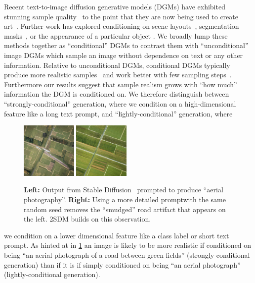 \label{sec:2sdm-intro}
Recent text-to-image diffusion generative models (DGMs) have exhibited stunning sample quality~\citep{saharia2022photorealistic} to the point that they are now being used to create art~\citep{oppenlaender2022creativity}. 
%
Further work has explored conditioning on scene layouts~\citep{zhang2023adding}, segmentation masks~\citep{zhang2023adding,hu2022self}, or the appearance of a particular object \citep{ma2023unified}. We broadly lump these methods together as ``conditional'' DGMs to contrast them with ``unconditional'' image DGMs which sample an image without dependence on text or any other information.
%
Relative to unconditional DGMs, conditional DGMs typically produce more realistic samples~\citep{ho2022classifier,bao2022conditional,hu2022self} and work better with few sampling steps~\citep{meng2022distillation}. Furthermore our results suggest that sample realism grows with ``how much'' information the DGM is conditioned on. We therefore distinguish between ``strongly-conditional'' generation, where we condition on a high-dimensional feature like a long text prompt, and ``lightly-conditional'' generation, where
\begin{figure}
    \centering
    \includegraphics[width=0.24\textwidth]{figs/2sdm/uncond-aerial-photo.jpg}
    \includegraphics[width=0.24\textwidth]{figs/2sdm/cond-aerial-photo.jpg}
    \caption{\textbf{Left:} Output from Stable Diffusion~\citep{rombach2022high} prompted to produce ``aerial photography''. \textbf{Right:} Using a more detailed prompt\protect\footnotemark with the same random seed removes the ``smudged'' road artifact that appears on the left. 2SDM builds on this observation.}
    \label{fig:stable-diffusion-example}
\end{figure}
we condition on a lower dimensional feature like a class label or short text prompt. As hinted at in \cref{fig:stable-diffusion-example} an image is likely to be more realistic if conditioned on being ``an aerial photograph of a road between green fields'' (strongly-conditional generation) than if it is if simply conditioned on being ``an aerial photograph'' (lightly-conditional generation). 

